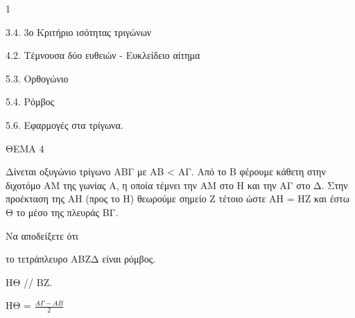 \begin{ylh}{1}
    \item 3.4. 3ο Κριτήριο ισότητας τριγώνων
    \item 4.2. Τέμνουσα δύο ευθειών - Ευκλείδειο αίτημα
    \item 5.3. Ορθογώνιο
    \item 5.4. Ρόμβος
    \item 5.6. Εφαρμογές στα τρίγωνα.
\end{ylh}

ΘΕΜΑ 4

Δίνεται οξυγώνιο τρίγωνο ΑΒΓ με ΑΒ \textless{} ΑΓ. Από το Β φέρουμε κάθετη στην διχοτόμο ΑΜ της γωνίας Α, η οποία τέμνει την ΑΜ στο Η και την ΑΓ στο Δ. Στην προέκταση της ΑΗ (προς το Η) θεωρούμε σημείο Ζ τέτοιο ώστε ΑΗ = ΗΖ και έστω Θ το μέσο της πλευράς ΒΓ.

Να αποδείξετε ότι

\begin{alist}
\item το τετράπλευρο ΑΒΖΔ είναι ρόμβος. 

\item ΗΘ // ΒΖ. 

\item ΗΘ = $\frac{Α\Gamma - ΑΒ}{2}$ 


\end{alist}
